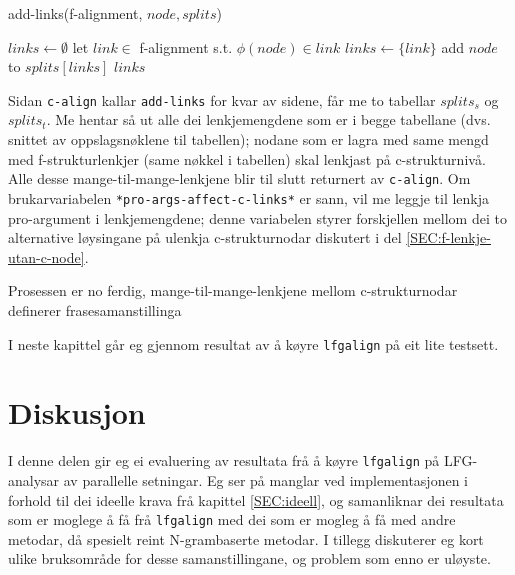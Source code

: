 \documentclass[11pt,a4paper,oneside,draft]{book}
\begin{document}
   \begin{algorithm}[]
   \caption{add-links(f-alignment, $node, splits$)}
   \label{algo:add-links}
      
        $links \gets \emptyset$\;
    {
        {
          let $link \in$ f-alignment s.t. $\phi(node) \in link$ \;
           {$links \gets \{link\}$} \;
           {
          }
        }
        add $node$ to $splits[links]$ \;
       }
        \Return $links$ \;
  \end{algorithm}

Sidan \texttt{c-align} kallar \texttt{add-links} for kvar av sidene, får me to
tabellar $splits_s$ og $splits_t$.  Me hentar så ut alle dei
lenkjemengdene som er i begge tabellane (dvs. snittet av
oppslagsnøklene til tabellen); nodane som er lagra med same mengd med
f-strukturlenkjer (same nøkkel i tabellen) skal lenkjast på
c-strukturnivå. Alle desse mange-til-mange-lenkjene blir til slutt
returnert av \texttt{c-align}. Om brukarvariabelen
\texttt{*pro-args-affect-c-links*} er sann, vil me leggje til lenkja
pro-argument i lenkjemengdene; denne variabelen styrer forskjellen
mellom dei to alternative løysingane på ulenkja c-strukturnodar
diskutert i del \ref{SEC:f-lenkje-utan-c-node}.

Prosessen er no ferdig, mange-til-mange-lenkjene mellom
c-strukturnodar definerer frasesamanstillinga

I neste kapittel går eg gjennom resultat av å køyre \texttt{lfgalign} på eit
lite testsett. 


\chapter{Diskusjon}
\label{sec-5}

\label{SEC:diskusjon}

 I denne delen gir eg ei evaluering av resultata frå å køyre
 \texttt{lfgalign} på LFG-analysar av parallelle setningar. Eg ser på manglar
 ved implementasjonen i forhold til dei ideelle krava frå kapittel
 \ref{SEC:ideell}, og samanliknar dei resultata som er moglege å få
 frå \texttt{lfgalign} med dei som er mogleg å få med andre metodar, då
 spesielt reint N-grambaserte metodar. I tillegg diskuterer eg kort
 ulike bruksområde for desse samanstillingane, og problem som enno er
 uløyste.
\end{document}
